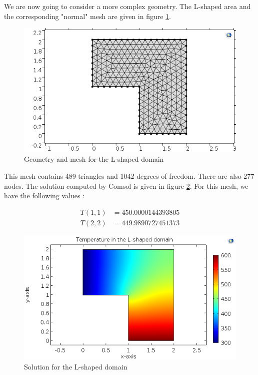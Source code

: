 We are now going to consider a more complex geometry. The L-shaped area and the corresponding "normal" mesh are given in figure \ref{Lmesh}.

\begin{figure}
\begin{center}
\includegraphics[scale=0.6]{Lmesh.png}
\caption{Geometry and mesh for the L-shaped domain}
\label{Lmesh}
\end{center} 
\end{figure}

This mesh contains 489 triangles and 1042 degrees of freedom. There are also 277 nodes. The solution computed by Comsol is given in figure \ref{laplaceL}. For this mesh, we have the following values :

\begin{align*}
T(1,1)&=450.0000144393805   \\
T(2,2)&=449.9890727451373
\end{align*}

\begin{figure}
\begin{center}
\includegraphics[scale=0.6]{laplaceL.png}
\caption{Solution for the L-shaped domain}
\label{laplaceL}
\end{center}
\end{figure}


